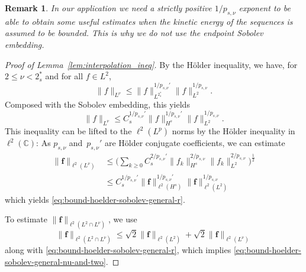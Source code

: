 \documentclass[12pt,a4paper]{amsart}
\newtheorem{remark}[theorem]{Remark}
\numberwithin{equation}{section}
\newcommand{\ulf}{\boldsymbol{f}}
\newcommand{\twoasts}{{2^*_s}}
\newcommand{\psnu}{p_{s,\nu}}
\begin{document}
	\begin{remark}
		In our application we need a strictly positive $1/\psnu$ exponent to be able to obtain some useful estimates when the kinetic energy of the sequences is assumed to be bounded. This is why we do not use the endpoint Sobolev embedding. %
	\end{remark}
	\begin{proof}[Proof of Lemma~\ref{lem:interpolation_ineq}]
		By the H\"older inequality, we have, for $ 2 \leq \nu < \twoasts  $ and for all $f\in L^2$,
		\begin{equation*}
			\| f \|_{L^{\nu}} \leq \| f \|_{L^{\twoasts }}^{1/\psnu'} \| f \|_{L^2}^{1/\psnu} .
		\end{equation*}
		Composed with the Sobolev embedding, this yields
		\begin{equation*}
			\| f \|_{L^{\nu}} \leq   C_s^{1/\psnu'} \| f \|_{H^{s}}^{1/\psnu'} \| f \|_{L^2}^{1/\psnu} . 
		\end{equation*}
		This inequality can be lifted to the $ \ell^2(L^p) $ norms by the H{\"o}lder inequality in $ \ell^2(\mathbb{C}) $: As $ \psnu $ and~$\psnu' $ are H{\"o}lder conjugate coefficients, we can estimate
		\begin{align*}
			\| \ulf  \|_{\ell^2(L^{\nu})} &\leq  \Big( \sum_{k \geq 0} C_s^{2/\psnu'} \| f_k \|_{H^{s}}^{2/\psnu} \| f_k \|_{L^2}^{2/\psnu} \Big)^{\frac{1}{2}}  \nonumber \\
			&\leq    C_s^{1/\psnu'} \| \ulf  \|_{\ell^2(H^{s})}^{1/\psnu'}  \| \ulf  \|_{\ell^2(L^2)}^{1/\psnu}
		\end{align*}
		which yields \eqref{eq:bound-hoelder-sobolev-general-r}.
		
		To estimate $\| \ulf  \|_{\ell^2(L^2\cap L^{\nu})}$, we use
		\begin{equation*}
			\| \ulf  \|_{\ell^2(L^2\cap L^{\nu})}
			\leq \sqrt{2} \|\ulf\|_{\ell^2(L^2)} +\sqrt{2} \|\ulf\|_{\ell^2(L^\nu)}
		\end{equation*}
		along with \eqref{eq:bound-hoelder-sobolev-general-r}, which implies \eqref{eq:bound-hoelder-sobolev-general-nu-and-two}.
	\end{proof}
	
\end{document}
